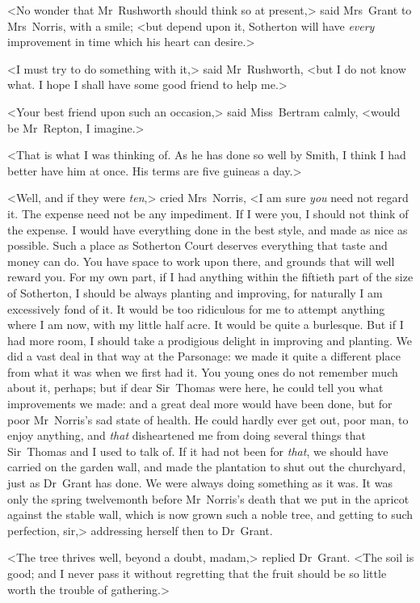 <No wonder that Mr~Rushworth should think so at present,> said Mrs~Grant to Mrs~Norris, with a smile; <but depend upon it, Sotherton will have \textit{every}  improvement in time which his heart can desire.>

<I must try to do something with it,> said Mr~Rushworth, <but I do not know what. I hope I shall have some good friend to help me.>

<Your best friend upon such an occasion,> said Miss~Bertram calmly, <would be Mr~Repton, I imagine.>

<That is what I was thinking of. As he has done so well by Smith, I think I had better have him at once. His terms are five guineas a day.>

<Well, and if they were \textit{ten},> cried Mrs~Norris, <I am sure \textit{you}  need not regard it. The expense need not be any impediment. If I were you, I should not think of the expense. I would have everything done in the best style, and made as nice as possible. Such a place as Sotherton Court deserves everything that taste and money can do. You have space to work upon there, and grounds that will well reward you. For my own part, if I had anything within the fiftieth part of the size of Sotherton, I should be always planting and improving, for naturally I am excessively fond of it. It would be too ridiculous for me to attempt anything where I am now, with my little half acre. It would be quite a burlesque. But if I had more room, I should take a prodigious delight in improving and planting. We did a vast deal in that way at the Parsonage: we made it quite a different place from what it was when we first had it. You young ones do not remember much about it, perhaps; but if dear Sir~Thomas were here, he could tell you what improvements we made: and a great deal more would have been done, but for poor Mr~Norris's sad state of health. He could hardly ever get out, poor man, to enjoy anything, and \textit{that}  disheartened me from doing several things that Sir~Thomas and I used to talk of. If it had not been for \textit{that}, we should have carried on the garden wall, and made the plantation to shut out the churchyard, just as Dr~Grant has done. We were always doing something as it was. It was only the spring twelvemonth before Mr~Norris's death that we put in the apricot against the stable wall, which is now grown such a noble tree, and getting to such perfection, sir,> addressing herself then to Dr~Grant.

<The tree thrives well, beyond a doubt, madam,> replied Dr~Grant. <The soil is good; and I never pass it without regretting that the fruit should be so little worth the trouble of gathering.>

